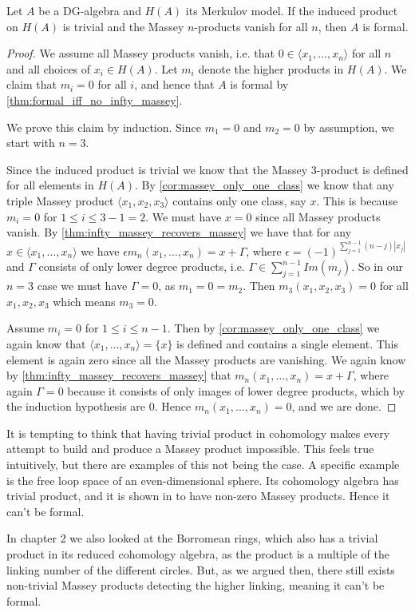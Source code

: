 \begin{theorem}
\label{thm:cuptrivial_no_massey_then_formal}
Let $A$ be a DG-algebra and $H(A)$ its Merkulov model. If the induced product on $H(A)$ is trivial and the Massey $n$-products vanish for all $n$, then $A$ is formal. 
\end{theorem}
\begin{proof}
We assume all Massey products vanish, i.e. that $0\in \langle x_1, \ldots, x_n\rangle $ for all $n$ and all choices of $x_i\in H(A)$. Let $m_i$ denote the higher products in $H(A)$. We claim that $m_i = 0$ for all $i$, and hence that $A$ is formal by \cref{thm:formal_iff_no_infty_massey}. 

We prove this claim by induction. Since $m_1 = 0$ and $m_2 = 0$ by assumption, we start with $n=3$. 

Since the induced product is trivial we know that the Massey 3-product is defined for all elements in $H(A)$. By \cref{cor:massey_only_one_class} we know that any triple Massey product $\langle x_1, x_2, x_3 \rangle$ contains only one class, say $x$. This is because $m_i = 0$ for $1\leq i\leq 3-1=2$. We must have $x=0$ since all Massey products vanish. By \cref{thm:infty_massey_recovers_massey} we have that for any $x\in \langle x_1, \ldots, x_n \rangle$ we have $\epsilon m_n(x_1,\ldots, x_n) = x+\Gamma$, where $ \epsilon = (-1)^{\sum_{j=1}^{n-1} (n-j)|x_j|}$ and $\Gamma$ consists of only lower degree products, i.e. $\Gamma \in \sum_{j=1}^{n-1}Im(m_j)$. So in our $n=3$ case we must have $\Gamma = 0$, as $m_1 = 0 = m_2$. Then $m_3(x_1, x_2, x_3)=0$ for all $x_1, x_2, x_3$ which means $m_3=0$. 

Assume $m_i = 0$ for $1\leq i\leq n-1$. Then by \cref{cor:massey_only_one_class} we again know that $\langle x_1, \ldots, x_n \rangle = \{x\}$ is defined and contains a single element. This element is again zero since all the Massey products are vanishing. We again know by \cref{thm:infty_massey_recovers_massey} that $m_n(x_1, \ldots, x_n)=x+\Gamma$, where again $\Gamma = 0$ because it consists of only images of lower degree products, which by the induction hypothesis are $0$. Hence $m_n(x_1, \ldots, x_n)=0$, and we are done. 
\end{proof}

It is tempting to think that having trivial product in cohomology makes every attempt to build and produce a Massey product impossible. This feels true intuitively, but there are examples of this not being the case. A specific example is the free loop space of an even-dimensional sphere. Its cohomology algebra has trivial product, and it is shown in \cite[Theorem 3.5]{nonformal_loop} to have non-zero Massey products. Hence it can't be formal. 

In chapter 2 we also looked at the Borromean rings, which also has a trivial product in its reduced cohomology algebra, as the product is a multiple of the linking number of the different circles. But, as we argued then, there still exists non-trivial Massey products detecting the higher linking, meaning it can't be formal. 



